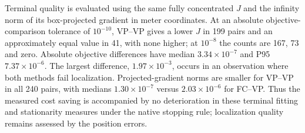 \documentclass[a4paper,fleqn,review]{cas-sc}
\begin{document}
Terminal quality is evaluated using the same fully concentrated $J$ and the infinity norm of its box-projected gradient in meter coordinates. At an absolute objective-comparison tolerance of $10^{-10}$, VP--VP gives a lower $J$ in 199 pairs and an approximately equal value in 41, with none higher; at $10^{-8}$ the counts are 167, 73 and zero. Absolute objective differences have median $3.34\times10^{-7}$ and P95 $7.37\times10^{-6}$. The largest difference, $1.97\times10^{-3}$, occurs in an observation where both methods fail localization. Projected-gradient norms are smaller for VP--VP in all 240 pairs, with medians $1.30\times10^{-7}$ versus $2.03\times10^{-6}$ for FC--VP. Thus the measured cost saving is accompanied by no deterioration in these terminal fitting and stationarity measures under the native stopping rule; localization quality remains assessed by the position errors.

\FloatBarrier
\end{document}
